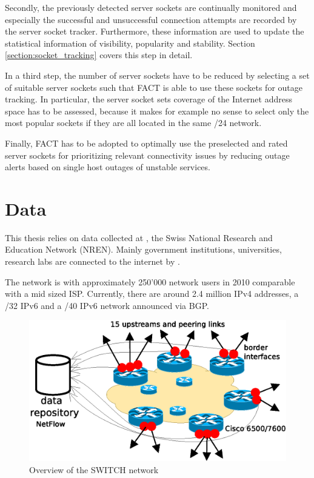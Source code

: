 Secondly, the previously detected server sockets are continually monitored and
especially the successful and unsuccessful connection attempts are recorded by
the server socket tracker.
Furthermore, these information are used to update the statistical information of
visibility, popularity and stability. Section \ref{section:socket_tracking}
covers this step in detail.

In a third step, the number of server sockets have to be reduced by selecting a 
set of suitable server sockets such that FACT is able to use these sockets for 
outage tracking. In particular, the server socket sets coverage of the Internet 
address space has to be assessed, because it makes for example no sense to 
select only the most popular sockets if they are all located in the same /24 
network.

Finally, FACT has to be adopted to optimally use the preselected and rated
server sockets for prioritizing relevant connectivity issues by reducing outage
alerts based on single host outages of unstable services.

\section{Data
\label{section:data}}

This thesis relies on data collected at \citet{switch}, the Swiss National 
Research and Education Network (NREN). Mainly government institutions, 
universities, research labs are connected to the internet by \citet{switch}\citep{Schatzmann:Mining}.

The \citet{switch} network is with approximately 250'000 network users in 2010 comparable with a mid sized ISP. Currently, there are around 2.4 million IPv4 addresses, a /32 IPv6 and a /40 IPv6 network announced via BGP\citep{Schatzmann:Tracing}.

\begin{figure}[h] 
	\centering
	\includegraphics[width=12cm]{images/network_overview.eps}
	\caption{Overview of the SWITCH network \citep{SchatzmanThesis2012}} 
	\label{fig:switch_nework}
\end{figure}

